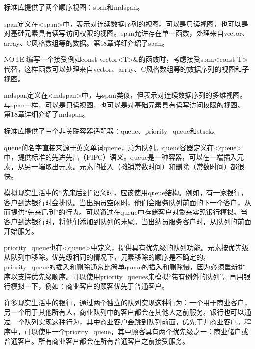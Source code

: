 
标准库提供了两个顺序视图：span和mdspan。


span定义在<span>中，表示对连续数据序列的视图。可以是只读视图，也可以是对基础元素具有读写访问权限的视图。span允许存在单一函数，处理来自vector、array、C风格数组等的数据。第18章详细介绍了span。

\begin{myNotic}{NOTE}
编写一个接受例如const vector<T>\&的函数时，考虑接受span<const T>代替，这样函数可以处理来自vector、array、C风格数组等的数据序列的视图和子视图。
\end{myNotic}



mdspan定义在<mdspan>中，与span类似，但表示对连续数据序列的多维视图。与span一样，可以是只读视图，也可以是对基础元素具有读写访问权限的视图。第18章详细介绍了mdspan。


标准库提供了三个非关联容器适配器：queue、priority\_queue和stack。


queue的名字直接来源于英文单词queue，意为队列。queue容器定义在<queue>中，提供标准的先进先出（FIFO）语义。queue是一种容器，可以在一端插入元素，从另一端取出元素。元素的插入（摊销常数时间）和删除（常数时间）都很快。

模拟现实生活中的“先来后到”语义时，应该使用queue结构。例如，有一家银行，客户到达银行时会排队。当出纳员空闲时，他们会服务队列前面的下一个客户，从而提供“先来后到”的行为。可以通过在queue中存储客户对象来实现银行模拟。当客户到达银行时，将他们添加到队列的末尾。当出纳员服务客户时，从队列的前面开始服务。


priority\_queue也在<queue>中定义，提供具有优先级的队列功能。元素按优先级从队列中移除。优先级相同的情况下，元素移除的顺序是不确定的。priority\_queue的插入和删除通常比简单queue的插入和删除慢，因为必须重新排序以支持优先级顺序。可以使用priority\_queues来模拟“带有例外的队列”。再用银行模拟一下，例如：商业客户的顾客优先于普通客户。

许多现实生活中的银行，通过两个独立的队列实现这种行为：一个用于商业客户，另一个用于其他所有人，商业队列中的客户都会在其他人之前服务。银行也可以通过一个队列实现这种行为，其中商业客户会跳到队列前面，优先于非商业客户。程序中，可以使用一个priority\_queue，其中顾客具有两个优先级之一：商业储户或普通客户。所有商业客户都会在所有普通客户之前接受服务。

